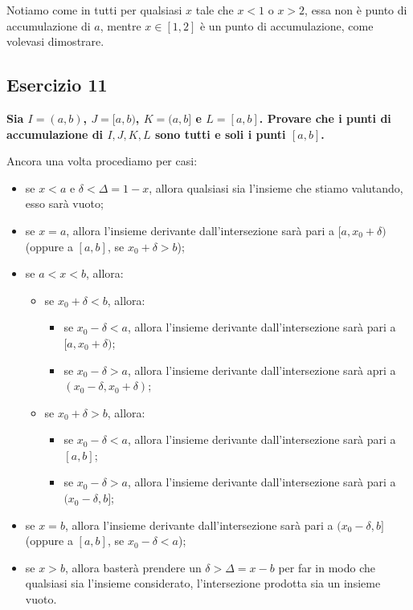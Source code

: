 \documentclass{article}
\begin{document}
\noindent Notiamo come in tutti per qualsiasi $x$ tale che $x < 1$ o $x > 2$, essa non è punto di accumulazione di $a$, mentre $x \in [1, 2]$ è un punto di accumulazione, come volevasi dimostrare.\\

\subsection{Esercizio 11}
\textbf{Sia $I = (a, b)$, $J = [a, b)$, $K = (a, b]$ e $L = [a, b]$. Provare che i punti di accumulazione di $I, J, K, L$ sono tutti e soli i punti $[a, b]$.}

\noindent Ancora una volta procediamo per casi:

\begin{itemize}
    \item se $x < a$ e $\delta < \Delta = 1 - x$, allora qualsiasi sia l'insieme che stiamo valutando, esso sarà vuoto;
    \item se $x = a$, allora l'insieme derivante dall'intersezione sarà pari a $[a, x_0 + \delta)$ (oppure a $[a, b]$, se $x_0 + \delta > b$);
    \item se $a < x < b$, allora:
    \begin{itemize}
        \item se $x_0 + \delta < b$, allora:
        \begin{itemize}
            \item se $x_0 - \delta < a$, allora l'insieme derivante dall'intersezione sarà pari a $[a, x_0 + \delta)$;
            \item se $x_0 - \delta > a$, allora l'insieme derivante dall'intersezione sarà apri a $(x_0 - \delta, x_0 + \delta)$;
        \end{itemize}
        \item se $x_0 + \delta > b$, allora:
        \begin{itemize}
            \item se $x_0 - \delta < a$, allora l'insieme derivante dall'intersezione sarà pari a $[a, b]$;
            \item se $x_0 - \delta > a$, allora l'insieme derivante dall'intersezione sarà pari a $(x_0 - \delta, b]$;
        \end{itemize}
    \end{itemize}
    \item se $x = b$, allora l'insieme derivante dall'intersezione sarà pari a $(x_0 - \delta, b]$ (oppure a $[a, b]$, se $x_0 - \delta < a$);
    \item se $x > b$, allora basterà prendere un $\delta > \Delta = x - b$ per far in modo che qualsiasi sia l'insieme considerato, l'intersezione prodotta sia un insieme vuoto.
\end{itemize}
\end{document}

